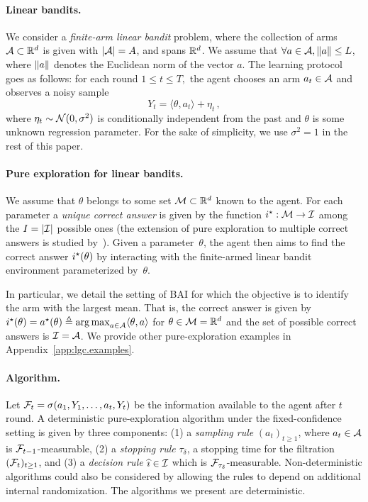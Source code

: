 \paragraph{Linear bandits.}
We consider a \emph{finite-arm linear bandit} problem, where the collection of arms $\mathcal{A}\subset \mathbb{R}^d$ is given  with $|\mathcal{A}|=A$, and spans $\mathbb{R}^d$. We assume that $\forall a\in\mathcal{A}, \left\lVert a\right\rVert\leq L$, where $\left\lVert a\right\rVert$ denotes the Euclidean norm of the vector $a$. The learning protocol goes as follows: for each round $1\leq t \leq T,$ the agent chooses an arm $a_t\in\mathcal{A}$ and observes a noisy sample
\[
Y_t =\langle \theta,a_t\rangle +\eta_t\,,
\]
where $\eta_t \sim \mathcal{N}(0,\sigma^2)$ is conditionally independent from the past and $\theta$ is some unknown regression parameter. For the sake of simplicity, we use $\sigma^2 = 1$ in the rest of this paper.

\paragraph{Pure exploration for linear bandits.}
We assume that $\theta$ belongs to some set $\mathcal{M}\subset\mathbb{R}^d$ known to the agent. %
For each parameter a \emph{unique correct answer} is given by the function $i^\star: \mathcal{M} \to \mathcal{I}$ among the $I = |\mathcal{I}|$ possible ones (the extension of pure exploration to multiple correct answers is studied by~\citealt{degenne2019pure}). Given a parameter~$\theta$, the agent then aims to find the correct answer $i^\star(\theta)$ by interacting with the finite-armed linear bandit environment parameterized by~$\theta$.

In particular, we detail the setting of BAI for which the objective is to identify the arm with the largest mean. That is, the correct answer is given by $i^\star(\theta)=a^\star(\theta)\triangleq \operatorname*{arg\,max}_{a\in\mathcal{A}} \langle\theta,a\rangle$ for $\theta\in\mathcal{M} = \mathbb{R}^d$ and the set of possible correct answers is $\mathcal{I} = \mathcal{A}$. We provide other pure-exploration examples in Appendix~\ref{app:lgc.examples}.

\paragraph{Algorithm.}
Let $\mathcal{F}_{t}=\sigma (a_1,Y_1,\ldots, a_t,Y_t)$ be the information available to the agent after $t$ round. A deterministic pure-exploration algorithm under the fixed-confidence setting is given by three components: (1) a \emph{sampling rule} $(a_t)_{t\geq 1}$, where $a_t\in\mathcal{A}$ is $\mathcal{F}_{t-1}$-measurable, (2) a \emph{stopping rule} $\tau_\delta$, a stopping time for the filtration $(\mathcal{F}_t)_{t\geq 1}$, and (3) a \emph{decision rule} $\widehat{\imath}\in \mathcal{I}$ which is $\mathcal{F}_{\tau_\delta}$-measurable.
Non-deterministic algorithms could also be considered by allowing the rules to depend on additional internal randomization. The algorithms we present are deterministic.

